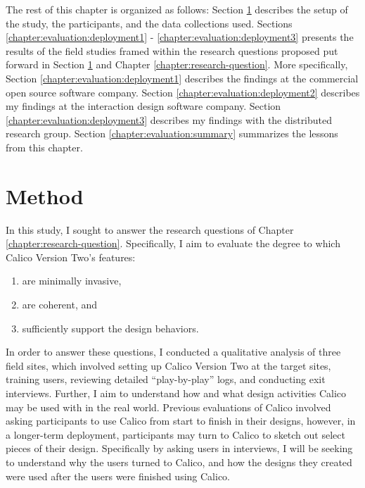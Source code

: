 The rest of this chapter is organized as follows: Section \ref{chapter:evaluation:overview} describes the setup of the study, the participants, and the data collections used. Sections \ref{chapter:evaluation:deployment1} - \ref{chapter:evaluation:deployment3} presents the results of the field studies framed within the research questions proposed put forward in Section \ref{chapter:evaluation:overview} and Chapter \ref{chapter:research-question}. More specifically, Section \ref{chapter:evaluation:deployment1} describes the findings at the commercial open source software company. Section \ref{chapter:evaluation:deployment2} describes my findings at the interaction design software company. Section \ref{chapter:evaluation:deployment3} describes my findings with the distributed research group. Section \ref{chapter:evaluation:summary} summarizes the lessons from this chapter.

\section{Method}
\label{chapter:evaluation:overview}

In this study, I sought to answer the research questions of Chapter \ref{chapter:research-question}. Specifically, I aim to evaluate the degree to which Calico Version Two's features:

\begin{enumerate}
	\item are minimally invasive,
	\item are coherent, and
	\item sufficiently support the design behaviors.
\end{enumerate}

In order to answer these questions, I conducted a qualitative analysis of three field sites, which involved setting up Calico Version Two at the target sites, training users, reviewing detailed ``play-by-play'' logs, and conducting exit interviews. Further, I aim to understand how and what design activities Calico may be used with in the real world. Previous evaluations of Calico involved asking participants to use Calico from start to finish in their designs, however, in a longer-term deployment, participants may turn to Calico to sketch out select pieces of their design. Specifically by asking users in interviews, I will be seeking to understand why the users turned to Calico, and how the designs they created were used after the users were finished using Calico.


